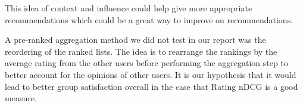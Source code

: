 This idea of context and influence could help give more appropriate recommendations which could be a great way to improve on recommendations.

A pre-ranked aggregation method we did not test in our report was the reordering of the ranked lists.
The idea is to rearrange the rankings by the average rating from the other users before performing the aggregation step to better account for the opinions of other users. It is our hypothesis that it would lead to better group satisfaction overall in the case that Rating nDCG is a good measure.